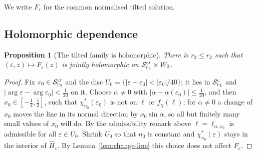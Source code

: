 \documentclass[11pt]{amsart}
\newtheorem{proposition}[theorem]{Proposition}
\theoremstyle{definition}
\begin{document}
We write $F_\varepsilon$ for the common normalised tilted solution.

\subsection{Holomorphic dependence}

\begin{proposition}[The tilted family is holomorphic]\label{prop:cusp-holo}
There is $r_3\le r_2$ such that $(\varepsilon,z)\mapsto F_\varepsilon(z)$ is jointly holomorphic on
$\mathcal S^{\rm c\prime}_{r_3}\times W_0$.
\end{proposition}

\begin{proof}
Fix $\varepsilon_0\in\mathcal S^{\rm c\prime}_{r_3}$ and the disc $U_0=\{|\varepsilon-\varepsilon_0|<|\varepsilon_0|/40\}$;
it lies in $\mathcal S^{\rm c}_{r_2}$ and $|\arg\varepsilon-\arg\varepsilon_0|<\tfrac1{20}$ on it.  Choose
$\alpha\ne0$ with $|\alpha-\alpha(\varepsilon_0)|\le\tfrac1{20}$, and then $x_0\in[-\tfrac12,\tfrac12]$, such that
$\chi^*_{n_0}(\varepsilon_0)$ is not on $\ell$ or $f_\chi(\ell)$; for $\alpha\ne0$ a change of $x_0$ moves the
line in its normal direction by $x_0\sin\alpha$, so all but finitely many small
values of $x_0$ will do.  By the admissibility remark above $\ell=\ell_{\alpha,x_0}$ is
admissible for all $\varepsilon\in U_0$.  Shrink $U_0$ so that $n_0$ is constant and
$\chi^*_{n_0}(\varepsilon)$ stays in the interior of $\hat H_\varepsilon$.  By Lemma~\ref{lem:change-line}
this choice does not affect $F_\varepsilon$.


\end{proof}
\end{document}
